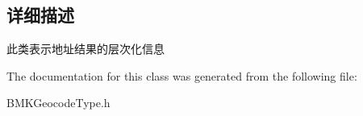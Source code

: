 \subsection{详细描述}
此类表示地址结果的层次化信息 

The documentation for this class was generated from the following file\-:\begin{DoxyCompactItemize}
\item 
B\-M\-K\-Geocode\-Type.\-h\end{DoxyCompactItemize}
